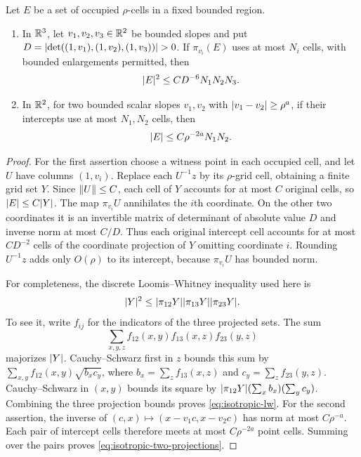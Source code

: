 \begin{lemma}
\label{lem:isotropic-grid-projections}
Let $E$ be a set of occupied $\rho$-cells in a fixed bounded region.
\begin{enumerate}
\item In $\mathbb R^3$, let $v_1,v_2,v_3\in\mathbb R^2$ be bounded slopes and put
$D=\lvert\det((1,v_1),(1,v_2),(1,v_3))\rvert>0$. If $\pi_{v_i}(E)$ uses at most
$N_i$ cells, with bounded enlargements permitted, then
\begin{equation}
 \lvert E\rvert^2\leq C D^{-6}N_1N_2N_3.
 \label{eq:isotropic-lw}
\end{equation}
\item In $\mathbb R^2$, for two bounded scalar slopes $v_1,v_2$ with
$\lvert v_1-v_2\rvert\geq\rho^a$, if their intercepts use at most $N_1,N_2$ cells,
then
\begin{equation}
 \lvert E\rvert\leq C\rho^{-2a}N_1N_2.
 \label{eq:isotropic-two-projections}
\end{equation}
\end{enumerate}
\end{lemma}

\begin{proof}
For the first assertion choose a witness point in each occupied cell, and
let $U$ have columns $(1,v_i)$. Replace each $U^{-1}z$ by its $\rho$-grid cell,
obtaining a finite grid set $Y$. Since $\lVert U\rVert\leq C$, each cell of $Y$
accounts for at most $C$ original cells, so $\lvert E\rvert\leq C\lvert Y\rvert$.
The map $\pi_{v_i}U$ annihilates the $i$th coordinate. On the other two
coordinates it is an invertible matrix of determinant of absolute value $D$
and inverse norm at most $C/D$. Thus each original intercept cell accounts
for at most $CD^{-2}$ cells of the coordinate projection of $Y$ omitting
coordinate $i$. Rounding $U^{-1}z$ adds only $O(\rho)$ to its intercept,
because $\pi_{v_i}U$ has bounded norm.

For completeness, the discrete Loomis--Whitney inequality
\citep{LoomisWhitney1949} used here is
\[
 \lvert Y\rvert^2\leq\lvert\pi_{12}Y\rvert\lvert\pi_{13}Y\rvert\lvert\pi_{23}Y\rvert.
\]
To see it, write $f_{ij}$ for the indicators of the three projected sets.
The sum
\[
 \sum_{x,y,z}f_{12}(x,y)f_{13}(x,z)f_{23}(y,z)
\]
majorizes $\lvert Y\rvert$.
Cauchy--Schwarz first in $z$ bounds this sum by
$\sum_{x,y}f_{12}(x,y)\sqrt{b_x c_y}$, where
$b_x=\sum_z f_{13}(x,z)$ and $c_y=\sum_z f_{23}(y,z)$.
Cauchy--Schwarz in $(x,y)$ bounds its square by
$\lvert\pi_{12}Y\rvert(\sum_x b_x)(\sum_y c_y)$.
Combining the three projection bounds proves \eqref{eq:isotropic-lw}.
For the second assertion, the inverse of
$(c,x)\mapsto(x-v_1c,x-v_2c)$ has norm at most $C\rho^{-a}$.
Each pair of intercept cells therefore meets at most $C\rho^{-2a}$ point
cells. Summing over the pairs proves \eqref{eq:isotropic-two-projections}.
\end{proof}

